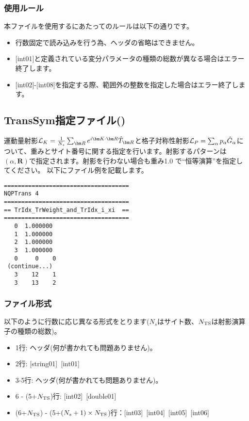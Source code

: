 \subsubsection{使用ルール}
本ファイルを使用するにあたってのルールは以下の通りです。
\begin{itemize}
\item 行数固定で読み込みを行う為、ヘッダの省略はできません。
\item $[$int01$]$と定義されている変分パラメータの種類の総数が異なる場合はエラー終了します。
\item $[$int02$]$-$[$int08$]$を指定する際、範囲外の整数を指定した場合はエラー終了します。
\end{itemize}



\newpage
\subsection{TransSym指定ファイル()}
\label{Subsec:TransSym}

運動量射影${\cal L}_K=\frac{1}{N_s}\sum_{{\bm R}}e^{i {\bm K} \cdot{\bm R} } \hat{T}_{\bm R}$と格子対称性射影${\cal L}_P=\sum_{\alpha}p_{\alpha} \hat{G}_{\alpha}$について、重みとサイト番号に関する指定を行います。射影するパターンは$(\alpha, {\bm R})$で指定されます。射影を行わない場合も重み1.0 で“恒等演算”を指定してください。
以下にファイル例を記載します。

\begin{minipage}{12.5cm}
\begin{screen}
\begin{verbatim}
====================================
NQPTrans 4  
====================================
== TrIdx_TrWeight_and_TrIdx_i_xi  ==
====================================
   0  1.000000
   1  1.000000
   2  1.000000
   3  1.000000
   0     0    0
 (continue...)
   3    12    1
   3    13    2 
\end{verbatim}
\end{screen}
\end{minipage}

\subsubsection{ファイル形式}
以下のように行数に応じ異なる形式をとります($N_s$はサイト数、$N_{\rm TS}$は射影演算子の種類の総数)。
 \begin{itemize}
   \item  1行:  ヘッダ(何が書かれても問題ありません)。
   \item  2行:   [string01]~[int01]
   \item  3-5行:  ヘッダ(何が書かれても問題ありません)。
   \item  6 - (5+$N_{\rm TS}$)行: [int02]~[double01]
   \item  (6+$N_{\rm TS}$) - (5+$(N_s+1) \times N_{\rm TS}$)行：[int03]~[int04]~[int05]~[int06]
  \end{itemize}
